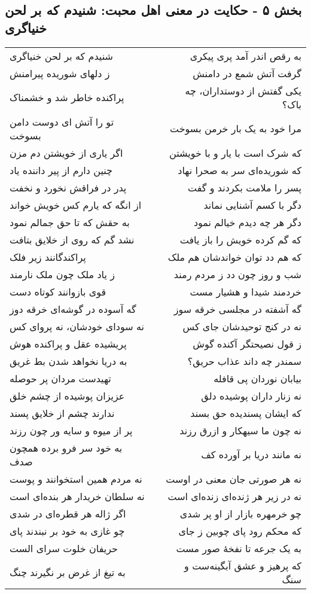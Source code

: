\begin{center}
\section*{بخش ۵ - حکایت در معنی اهل محبت: شنیدم که بر لحن خنیاگری}
\label{sec:005}
\begin{longtable}{l p{0.5cm} r}
شنیدم که بر لحن خنیاگری
&&
به رقص اندر آمد پری پیکری
\\
ز دلهای شوریده پیرامنش
&&
گرفت آتش شمع در دامنش
\\
پراکنده خاطر شد و خشمناک
&&
یکی گفتش از دوستداران، چه باک؟
\\
تو را آتش ای دوست دامن بسوخت
&&
مرا خود به یک بار خرمن بسوخت
\\
اگر یاری از خویشتن دم مزن
&&
که شرک است با یار و با خویشتن
\\
چنین دارم از پیر داننده یاد
&&
که شوریده‌ای سر به صحرا نهاد
\\
پدر در فراقش نخورد و نخفت
&&
پسر را ملامت بکردند و گفت
\\
از انگه که یارم کس خویش خواند
&&
دگر با کسم آشنایی نماند
\\
به حقش که تا حق جمالم نمود
&&
دگر هر چه دیدم خیالم نمود
\\
نشد گم که روی از خلایق بتافت
&&
که گم کرده خویش را باز یافت
\\
پراکندگانند زیر فلک
&&
که هم دد توان خواندشان هم ملک
\\
ز یاد ملک چون ملک نارمند
&&
شب و روز چون دد ز مردم رمند
\\
قوی بازوانند کوتاه دست
&&
خردمند شیدا و هشیار مست
\\
گه آسوده در گوشه‌ای خرقه دوز
&&
گه آشفته در مجلسی خرقه سوز
\\
نه سودای خودشان، نه پروای کس
&&
نه در کنج توحیدشان جای کس
\\
پریشیده عقل و پراکنده هوش
&&
ز قول نصیحتگر آکنده گوش
\\
به دریا نخواهد شدن بط غریق
&&
سمندر چه داند عذاب حریق؟
\\
تهیدست مردان پر حوصله
&&
بیابان نوردان پی قافله
\\
عزیزان پوشیده از چشم خلق
&&
نه زنار داران پوشیده دلق
\\
ندارند چشم از خلایق پسند
&&
که ایشان پسندیده حق بسند
\\
پر از میوه و سایه ور چون رزند
&&
نه چون ما سیهکار و ازرق رزند
\\
به خود سر فرو برده همچون صدف
&&
نه مانند دریا بر آورده کف
\\
نه مردم همین استخوانند و پوست
&&
نه هر صورتی جان معنی در اوست
\\
نه سلطان خریدار هر بنده‌ای است
&&
نه در زیر هر ژنده‌ای زنده‌ای است
\\
اگر ژاله هر قطره‌ای در شدی
&&
چو خرمهره بازار از او پر شدی
\\
چو غازی به خود بر نبندند پای
&&
که محکم رود پای چوبین ز جای
\\
حریفان خلوت سرای الست
&&
به یک جرعه تا نفخهٔ صور مست
\\
به تیغ از غرض بر نگیرند چنگ
&&
که پرهیز و عشق آبگینه‌ست و سنگ
\\
\end{longtable}
\end{center}
